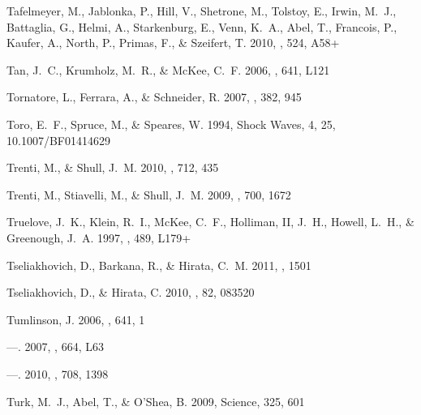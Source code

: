 \documentclass[apj]{emulateapj}
\begin{document}
\begin{thebibliography}{108}
{Tafelmeyer}, M., {Jablonka}, P., {Hill}, V., {Shetrone}, M., {Tolstoy}, E.,
  {Irwin}, M.~J., {Battaglia}, G., {Helmi}, A., {Starkenburg}, E., {Venn},
  K.~A., {Abel}, T., {Francois}, P., {Kaufer}, A., {North}, P., {Primas}, F.,
  \& {Szeifert}, T. 2010, \aap, 524, A58+

{Tan}, J.~C., {Krumholz}, M.~R., \& {McKee}, C.~F. 2006, \apjl, 641, L121

{Tornatore}, L., {Ferrara}, A., \& {Schneider}, R. 2007, \mnras, 382, 945

Toro, E.~F., Spruce, M., \& Speares, W. 1994, Shock Waves, 4, 25,
  10.1007/BF01414629

{Trenti}, M., \& {Shull}, J.~M. 2010, \apj, 712, 435

{Trenti}, M., {Stiavelli}, M., \& {Shull}, J.~M. 2009, \apj, 700, 1672

{Truelove}, J.~K., {Klein}, R.~I., {McKee}, C.~F., {Holliman}, II, J.~H.,
  {Howell}, L.~H., \& {Greenough}, J.~A. 1997, \apjl, 489, L179+

{Tseliakhovich}, D., {Barkana}, R., \& {Hirata}, C.~M. 2011, \mnras, 1501

{Tseliakhovich}, D., \& {Hirata}, C. 2010, \prd, 82, 083520

{Tumlinson}, J. 2006, \apj, 641, 1

---. 2007, \apjl, 664, L63

---. 2010, \apj, 708, 1398

{Turk}, M.~J., {Abel}, T., \& {O'Shea}, B. 2009, Science, 325, 601


\end{thebibliography}
\end{document}
